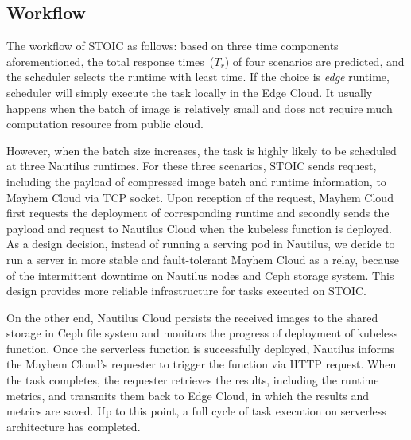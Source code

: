 \subsection{Workflow}
 The workflow of STOIC as follows: based on three time components aforementioned, the total response times~($T_r$) of four scenarios are predicted, and the scheduler selects the runtime with least time. If the choice is \textit{edge} runtime, scheduler will simply execute the task locally in the Edge Cloud. It usually happens when the batch of image is relatively small and does not require much computation resource from public cloud.
 
 However, when the batch size increases, the task is highly likely to be scheduled at three Nautilus runtimes. For these three scenarios, STOIC sends request, including the payload of compressed image batch and runtime information, to Mayhem Cloud via TCP socket. Upon reception of the request, Mayhem Cloud first requests the deployment of corresponding runtime and secondly sends the payload and request to Nautilus Cloud when the kubeless function is deployed. As a design decision, instead of running a serving pod in Nautilus, we decide to run a server in more stable and fault-tolerant Mayhem Cloud as a relay, because of the intermittent downtime on Nautilus nodes and Ceph storage system. This design provides more reliable infrastructure for tasks executed on STOIC.
 
 On the other end, Nautilus Cloud persists the received images to the shared storage in Ceph file system and monitors the progress of deployment of kubeless function. Once the serverless function is successfully deployed, Nautilus informs the Mayhem Cloud's requester to trigger the function via HTTP request. When the task completes, the requester retrieves the results, including the runtime metrics, and transmits them back to Edge Cloud, in which the results and metrics are saved. Up to this point, a full cycle of task execution on serverless architecture has completed.
 
